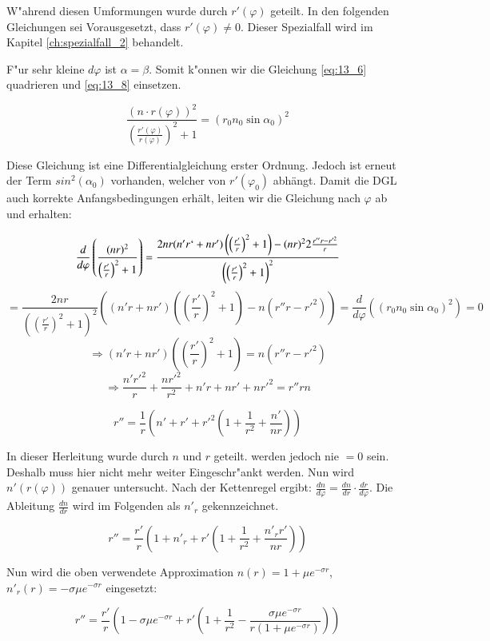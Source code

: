 W"ahrend diesen Umformungen wurde durch $r'(\varphi)$ geteilt. 
In den folgenden Gleichungen sei Vorausgesetzt, dass $r'(\varphi) \neq 0$. 
Dieser Spezialfall wird im Kapitel \ref{ch:spezialfall_2} behandelt. 

F"ur sehr kleine $d\varphi$ ist $\alpha = \beta$. 
Somit k"onnen wir die Gleichung \ref{eq:13_6} quadrieren und \ref{eq:13_8} einsetzen.

$$\frac{(n \cdot r(\varphi))^2}{\left( \frac{r'(\varphi)}{r(\varphi)} \right)^2 +1} = (r_0 n_0 \sin \alpha_0)^2$$

Diese Gleichung ist eine Differentialgleichung erster Ordnung. 
Jedoch ist erneut der Term $sin^2(\alpha_0)$ vorhanden, welcher von $r'(\varphi_0)$ abhängt. 
Damit die DGL auch korrekte Anfangsbedingungen erhält, leiten wir die Gleichung nach $\varphi$ ab und erhalten:

$$\frac{d}{d\varphi}\left(\frac{(n r)^2}{\left(\frac{r'}{r}\right)^2 + 1}\right) =  \frac{2nr (n'r `+ nr') \left( \left( \frac{r'}{r} \right)^2 +1\right) - (nr)^2 2 \frac{r'' r - r'^2}{r}}{\left( \left( \frac{r'}{r} \right)^2 + 1 \right)^2}$$
$$ = \frac{2nr}{\left( \left( \frac{r'}{r} \right)^2 + 1 \right)^2} \left( (n'r + nr') \left( \left( \frac{r'}{r} \right)^2 + 1 \right) - n \left( r'' r - r'^2 \right) \right) = \frac{d}{d\varphi} \left(\left( r_0 n_0 \sin \alpha_0\right)^2 \right) = 0$$
$$\Rightarrow (n'r + nr') \left( \left( \frac{r'}{r} \right)^2 + 1 \right) = n \left( r'' r - r'^2 \right)$$
$$\Rightarrow \frac{n'r'^2}{r} + \frac{n r'^2}{r^2} + n'r + nr' + nr'^2 = r'' r n$$

\begin{equation}
r'' = \frac{1}{r} \left( n' + r' + r'^2 \left( 1 + \frac{1}{r^2} + \frac{n'}{n r} \right) \right)
\end{equation}

In dieser Herleitung wurde durch $n$ und $r$ geteilt. werden jedoch nie $= 0$ sein.
Deshalb muss hier nicht mehr weiter Eingeschr"ankt werden. 
Nun wird $n'(r(\varphi))$ genauer untersucht. 
Nach der Kettenregel ergibt: $\frac{dn}{d\varphi} = \frac{dn}{dr} \cdot \frac{dr}{d\varphi}$. 
Die Ableitung $\frac{dn}{dr}$ wird im Folgenden als $n'_r$ gekennzeichnet.

$$r'' = \frac{r'}{r} \left( 1 + n'_r + r' \left( 1 + \frac{1}{r^2} + \frac{n'_r r'}{n r}\right) \right)$$

Nun wird die oben verwendete Approximation $n(r) = 1 + \mu e^{-\sigma r}$, $n'_r(r) = -\sigma \mu e^{-\sigma r}$ eingesetzt:

\begin{equation} \label{eq:sphere_dgl_approx}
r'' = \frac{r'}{r} \left(1 - \sigma \mu e^{-\sigma r} + r' \left( 1 + \frac{1}{r^2} - \frac{\sigma \mu e^{-\sigma r}}{r (1 + \mu e^{-\sigma r})} \right) \right)
\end{equation}



